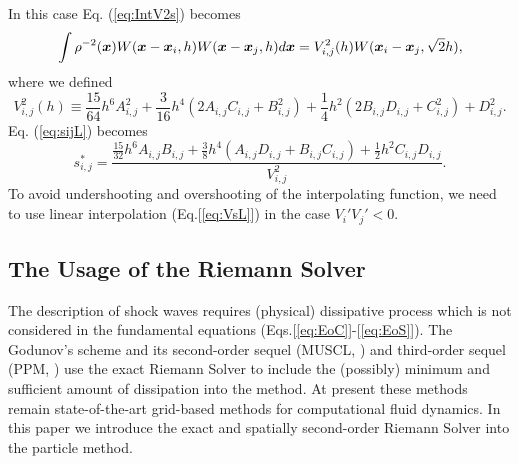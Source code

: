 \documentclass{cjour}
\newcommand{ \Vec   }[1]{ \mbox{\boldmath $ #1 $} }
\begin{document}
\begin{article}
\begin{equation}
                                                       \label{eq:V2s}
\end{equation}
In this case Eq. (\ref{eq:IntV2s}) becomes 
\begin{equation}
     \int \rho^{-2}(\Vec{x})
             W(\Vec{x}-\Vec{x}_i, h)
             W(\Vec{x}-\Vec{x}_j, h) d\Vec{x} =   
     V_{i,j}^2 (h) W(\Vec{x}_i-\Vec{x}_j, \sqrt{2}h) ,
                                                    \label{eq:IntV2sC} 
\end{equation}
where we defined 
\begin{equation} 
       V_{i,j}^2 (h) \equiv
         \frac{15}{64} h^6   A_{i,j}^2 
       + \frac{ 3}{16} h^4 (2A_{i,j}C_{i,j}+B_{i,j}^2) 
       + \frac{ 1}{4 } h^2 (2B_{i,j}D_{i,j}+C_{i,j}^2) 
       +                     D_{i,j}^2     . 
                                                      \label{eq:V2ij} 
\end{equation}
Eq. (\ref{eq:sijL}) becomes 
\begin{equation}
          s^*_{i,j} = \frac{  \frac{15}{32} h^6  A_{i,j}B_{i,j} 
                            + \frac{3}{8}   h^4 (A_{i,j}D_{i,j}+
                                                 B_{i,j}C_{i,j}) 
                            + \frac{1}{2}   h^2  C_{i,j}D_{i,j} }
                           { V^2_{i,j} } . 
                                                      \label{eq:sijS} 
\end{equation}
To avoid undershooting and overshooting of the interpolating function, 
we need to use linear interpolation (Eq.[\ref{eq:VsL}]) in the case 
$V_i' V_j' <0 $. 




 \subsection{The Usage of the Riemann Solver}
                                                   \label{Sec:Riemann}
The description of shock waves requires (physical) dissipative 
process which is not considered in the fundamental equations 
(Eqs.[\ref{eq:EoC}]-[\ref{eq:EoS}]). 
The Godunov's scheme and 
its second-order sequel (MUSCL, \cite{vL:1979}) and 
third-order sequel (PPM, \cite{CW:PPM}) 
use the exact Riemann Solver to include the (possibly) minimum and 
sufficient amount of dissipation into the method. 
At present these methods remain state-of-the-art grid-based methods 
for computational fluid dynamics. 
In this paper we introduce the exact and spatially second-order 
Riemann Solver into the particle method. 



\end{article}
\end{document}
